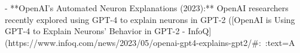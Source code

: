 - **OpenAI’s Automated Neuron Explanations (2023):** OpenAI researchers recently explored using GPT-4 to explain neurons in GPT-2 ([OpenAI is Using GPT-4 to Explain Neurons' Behavior in GPT-2 - InfoQ](https://www.infoq.com/news/2023/05/openai-gpt4-explains-gpt2/#:~:text=A%

